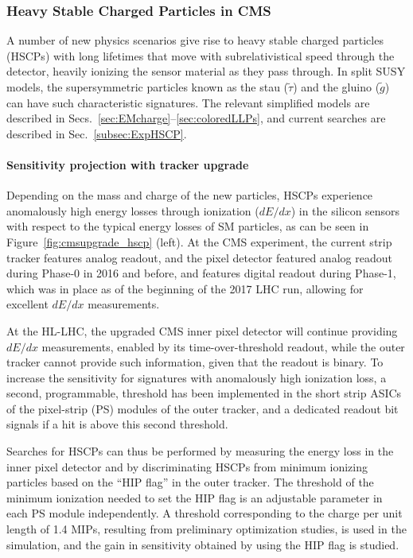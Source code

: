 \subsubsection{Heavy Stable Charged Particles in CMS}

A number of new physics scenarios give rise to heavy stable charged particles (HSCPs) with long lifetimes that move with subrelativistical speed through the detector, heavily ionizing the sensor material as they pass through. In split SUSY models, the supersymmetric particles known as the stau ($\tilde{\tau}$) and the gluino ($\tilde{g}$) can have such characteristic signatures. The relevant simplified models are described in Secs.~\ref{sec:EMcharge}--\ref{sec:coloredLLPs}, and current searches are described in Sec.~\ref{subsec:ExpHSCP}.

\paragraph{Sensitivity projection with tracker upgrade}

Depending on the mass and charge of the new particles, HSCPs experience anomalously high energy losses through ionization ($dE/dx$) in the silicon sensors with respect to the typical energy losses of SM particles, as can be seen in Figure~\ref{fig:cmsupgrade_hscp} (left). At the CMS experiment, the current strip tracker features analog readout, and the pixel detector featured analog readout during Phase-0 in 2016 and before, and features digital readout during Phase-1, which was in place as of the beginning of the 2017 LHC run, allowing for excellent $dE/dx$ measurements.

At the HL-LHC, the upgraded CMS inner pixel detector will continue providing $dE/dx$ measurements, enabled by its time-over-threshold readout, while the outer tracker cannot provide such information, given that the readout is binary. To increase the sensitivity for signatures with anomalously high ionization loss, a second, programmable, threshold has been implemented in the short strip ASICs of the pixel-strip (PS) modules of the outer tracker, and a dedicated readout bit signals if a hit is above this second threshold.

Searches for HSCPs can thus be performed by measuring the energy loss in the inner pixel detector and by discriminating HSCPs from minimum ionizing particles based on the ``HIP flag'' in the outer tracker. The threshold of the minimum ionization needed to set the HIP flag is an adjustable parameter in each PS module independently. A threshold corresponding to the charge per unit length of 1.4 MIPs, resulting from preliminary optimization studies, is used in the simulation, and the gain in sensitivity obtained by using the HIP flag is studied.

